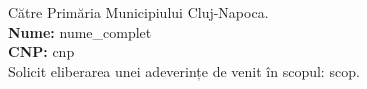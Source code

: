 \documentclass[11pt]{article}
\begin{document}
Către Primăria Municipiului Cluj-Napoca.\\[0.3cm]
\textbf{Nume:} {{nume_complet}}\\
\textbf{CNP:} {{cnp}}\\[0.2cm]
Solicit eliberarea unei adeverințe de venit în scopul: {{scop}}.
\signatureblock
\end{document}
